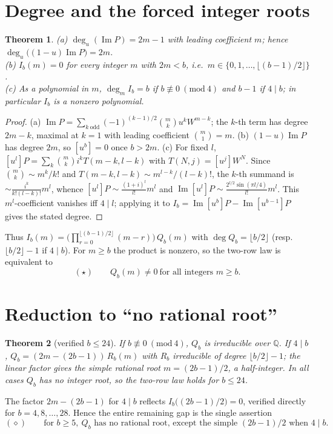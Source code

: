 \documentclass[11pt]{article}
\newtheorem{theorem}{Theorem}
\theoremstyle{definition}
\DeclareMathOperator{\Imag}{Im}
\begin{document}
\section{Degree and the forced integer roots}
\begin{theorem}\label{thm:roots}
\textup{(a)} $\deg_u(\Imag P)=2m-1$ with leading coefficient $m$; hence
$\deg_u\big((1-u)\Imag P\big)=2m$.\\
\textup{(b)} $I_b(m)=0$ for every integer $m$ with $2m<b$, i.e.\ $m\in\{0,1,\dots,\lfloor(b-1)/2\rfloor\}$.\\
\textup{(c)} As a polynomial in $m$, $\deg_m I_b=b$ if $b\not\equiv0\ (\mathrm{mod}\ 4)$ and
$b-1$ if $4\mid b$; in particular $I_b$ is a nonzero polynomial.
\end{theorem}
\begin{proof}
(a) $\Imag P=\sum_{k\ \mathrm{odd}}(-1)^{(k-1)/2}\binom mk u^kW^{m-k}$; the $k$-th term has
degree $2m-k$, maximal at $k=1$ with leading coefficient $\binom m1=m$.
(b) $(1-u)\Imag P$ has degree $2m$, so $[u^b]=0$ once $b>2m$.
(c) For fixed $l$, $[u^l]P=\sum_k\binom mk i^k T(m-k,l-k)$ with $T(N,j)=[u^j]W^N$. Since
$\binom mk\sim m^k/k!$ and $T(m-k,l-k)\sim m^{l-k}/(l-k)!$, the $k$-th summand is
$\sim\frac{i^k}{k!(l-k)!}m^l$, whence $[u^l]P\sim\frac{(1+i)^l}{l!}m^l$ and
$\Imag[u^l]P\sim\frac{2^{l/2}\sin(\pi l/4)}{l!}m^l$. This $m^l$-coefficient vanishes iff
$4\mid l$; applying it to $I_b=\Imag[u^b]P-\Imag[u^{b-1}]P$ gives the stated degree.
\end{proof}
Thus $I_b(m)=\Big(\prod_{r=0}^{\lfloor(b-1)/2\rfloor}(m-r)\Big)\,Q_b(m)$ with
$\deg Q_b=\lfloor b/2\rfloor$ (resp.\ $\lfloor b/2\rfloor-1$ if $4\mid b$). For $m\ge b$ the
product is nonzero, so the two-row law is equivalent to
\[
  (\star)\qquad Q_b(m)\neq0\ \text{for all integers } m\ge b.
\]

\section{Reduction to ``no rational root''}
\begin{theorem}[verified $b\le24$]\label{thm:irred}
If $b\not\equiv0\ (\mathrm{mod}\ 4)$, $Q_b$ is irreducible over $\mathbb Q$. If $4\mid b$,
$Q_b=(2m-(2b-1))\,R_b(m)$ with $R_b$ irreducible of degree $\lfloor b/2\rfloor-1$; the linear
factor gives the simple rational root $m=(2b-1)/2$, a half-integer. In all cases $Q_b$ has no
integer root, so the two-row law holds for $b\le24$.
\end{theorem}
The factor $2m-(2b-1)$ for $4\mid b$ reflects $I_b\big((2b-1)/2\big)=0$, verified directly for
$b=4,8,\dots,28$. Hence the entire remaining gap is the single assertion
\[
  (\diamond)\qquad\text{for }b\ge5,\ Q_b\text{ has no rational root, except the simple }
  (2b-1)/2\text{ when }4\mid b.
\]
\end{document}
